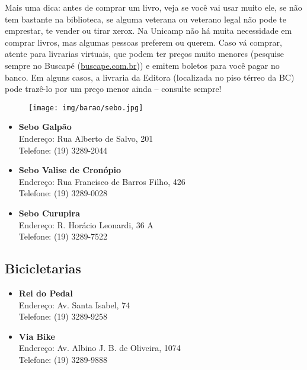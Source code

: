 Mais uma dica: antes de comprar um livro, veja se você vai usar muito ele, se
não tem bastante na biblioteca, se alguma veterana ou veterano legal não pode
te emprestar, te vender ou tirar xerox. Na Unicamp não há muita necessidade em
comprar livros, mas algumas pessoas preferem ou querem. Caso vá comprar, atente
para livrarias virtuais, que podem ter preços muito menores (pesquise sempre no
Buscapé (\url{buscape.com.br})) e emitem boletos para você pagar no banco. Em
alguns casos, a livraria da Editora (localizada no piso térreo da BC) pode
trazê-lo por um preço menor ainda -- consulte sempre!

\begin{figure}[h!]
  \centering
  \texttt{[image: img/barao/sebo.jpg]}
\end{figure}

\begin{itemize}
\item \textbf{Sebo Galpão}
  \\Endereço: Rua Alberto de Salvo, 201
  \\Telefone: (19) 3289-2044

\item \textbf{Sebo Valise de Cronópio}
  \\Endereço: Rua Francisco de Barros Filho, 426
  \\Telefone: (19) 3289-0028

\item \textbf{Sebo Curupira}
  \\Endereço: R. Horácio Leonardi, 36 A
  \\Telefone: (19) 3289-7522
\end{itemize}

\subsection{Bicicletarias}

\begin{itemize}
\item \textbf{Rei do Pedal}
  \\Endereço: Av. Santa Isabel, 74
  \\Telefone: (19) 3289-9258

\item \textbf{Via Bike}
  \\Endereço: Av. Albino J. B. de Oliveira, 1074
  \\Telefone: (19) 3289-9888
\end{itemize}

